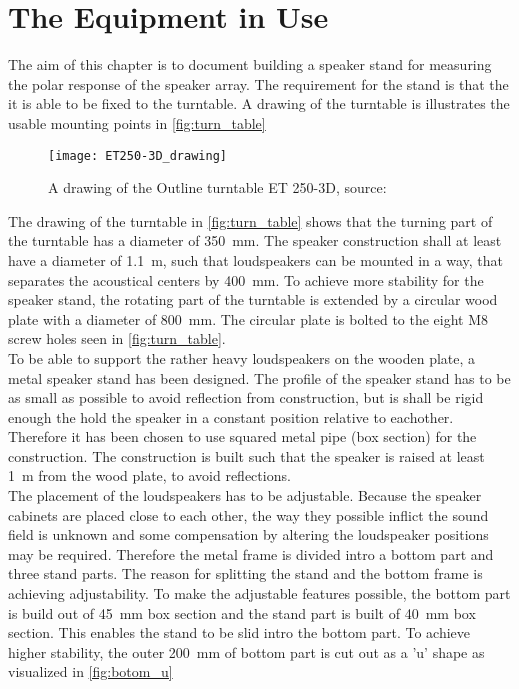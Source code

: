 \section{The Equipment in Use}\label{sec:hardware}
The aim of this chapter is to document building a speaker stand for measuring the polar response of the speaker array. The requirement for the stand is that the it is able to be fixed to the turntable. A drawing of the turntable is illustrates the usable mounting points in \autoref{fig:turn_table}


 \begin{figure}[H]
	\centering
	\texttt{[image: ET250-3D\_drawing]}
	\caption{A drawing of the Outline turntable ET 250-3D, source: \citep{ET250-3D}}
		\label{fig:turn_table}
\end{figure}



The drawing of the turntable in \autoref{fig:turn_table} shows that the turning part of the turntable has a diameter of \SI{350}{\milli\meter}. The speaker construction shall at least have a diameter of \SI{1.1}{\meter}, such that loudspeakers can be mounted in a way, that separates the acoustical centers by \SI{400}{\milli\meter}. To achieve more stability for the speaker stand, the rotating part of the turntable is extended by a circular wood plate with a diameter of \SI{800}{\milli\meter}. The circular plate is bolted to the eight M8 screw holes seen in \autoref{fig:turn_table}. \\
To be able to support the rather heavy loudspeakers on the wooden plate, a metal speaker stand has been designed. The profile of the speaker stand has to be as small as possible to avoid reflection from construction, but is shall be rigid enough the hold the speaker in a constant position relative to eachother. Therefore it has been chosen to use squared metal pipe (box section) for the construction. The construction is built such that the speaker is raised at least \SI{1}{\meter} from the wood plate, to avoid reflections.\\
The placement of the loudspeakers has to be adjustable. Because the speaker cabinets are placed close to each other, the way they possible inflict the sound field is unknown and some compensation by altering the loudspeaker positions may be required. Therefore the metal frame is divided intro a bottom part and three stand parts. The reason for splitting the stand and the bottom frame is achieving adjustability. To make the adjustable features possible, the bottom part is build out of \SI{45}{\milli\meter} box section and the stand part is built of \SI{40}{\milli\meter} box section. This enables the stand to be slid intro the bottom part. To achieve higher stability, the outer \SI{200}{\milli\meter} of bottom part is cut out as a 'u' shape as visualized in \autoref{fig:botom_u}

